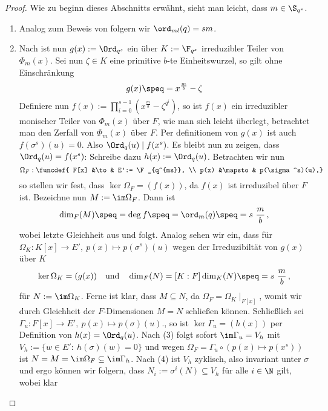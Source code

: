 \begin{proof}
  Wie zu beginn dieses Abschnitts erwähnt, sieht man leicht, dass
  $m \in \S_{q^s}$.
  \begin{enumerate}
    \item Analog zum Beweis von  
      folgern wir $\ord_{ml}(q) = sm$.
    \item Nach  ist nun
      $g(x) := \Ord_{q^s}$ ein über $K := \F_{q^s}$ irreduzibler Teiler von
      $\Phi_m(x)$. Sei nun $\zeta\in K$ eine primitive $b$-te Einheitswurzel,
      so gilt ohne Einschränkung
      \[ g(x) \speq= x^{\frac m b} -\zeta\]
      Definiere nun $f(x) := \prod_{i=0}^{s-1} (x^{\frac m b} - \zeta^{q^i})$, 
      so ist $f(x)$ ein irreduzibler monischer Teiler von $\Phi_m(x)$ über $F$,
      wie man sich leicht überlegt, betrachtet man den Zerfall von
      $\Phi_m(x)$ über $F$. Per definitionem von $g(x)$ ist auch
      $f(\sigma^s)(u) = 0$. Also $\Ord_q(u) \mid f(x^s)$.
      Es bleibt nun zu zeigen, dass $\Ord_q(u) = f(x^s)$:
      Schreibe dazu $h(x) := \Ord_q(u)$. 
      Betrachten wir nun 
      \[ \Omega_F:\funcdef{ F[x] &\to& E':= \F_{q^{ms}}, \\
        p(x) &\mapsto& p(\sigma^s)(u),}\]
      so stellen wir fest, dass $\ker\Omega_F = (f(x))$, da $f(x)$ ist irreduzibel
      über $F$ ist.
      Bezeichne nun $M := \im\Omega_F$. Dann ist 
      \[ \dim_F(M) \speq= \deg f \speq= \ord_m(q) \speq= s\ \frac m b\,,\]
      wobei letzte Gleichheit aus  und 
      folgt. Analog sehen wir ein, dass für
      $\Omega_K: K[x] \to E',\ p(x) \mapsto p(\sigma^s)(u)$ wegen der
      Irreduzibiltät von $g(x)$ über $K$
      \[ \ker\Omega_K = (g(x)) \quad\text{und}\quad
        \dim_F(N)= [K:F]\dim_K(N) \speq= s\ \frac m b\,,\]
      für $N := \im\Omega_K$. Ferne ist klar, dass $M\subseteq N$, da
      $\Omega_F = \Omega_K\mid_{F[x]}$, womit wir durch Gleichheit der
      $F$-Dimensionen $M=N$ schließen können.
      Schließlich sei $\Gamma_u: F[x]\to E',\ p(x) \mapsto p(\sigma)(u)$., so
      ist $\ker\Gamma_u = (h(x))$ per Definition von $h(x)= \Ord_q(u)$. 
      Nach  (3) folgt sofort
      $\im\Gamma_u = V_h$ mit $V_h := \{ w\in E':\ h(\sigma)(w) = 0 \}$
      und wegen $\Omega_F = \Gamma_u \circ (p(x)\mapsto p(x^s))$ ist
      $N = M = \im\Omega_F \subseteq \im \Gamma_h$. Nach 
       (4) ist $V_h$ zyklisch, also invariant
      unter $\sigma$ und ergo können wir folgern, dass
      $N_i := \sigma^i(N) \subseteq V_h$ für alle $i\in \N$ gilt, wobei klar

\end{enumerate}
\end{proof}
